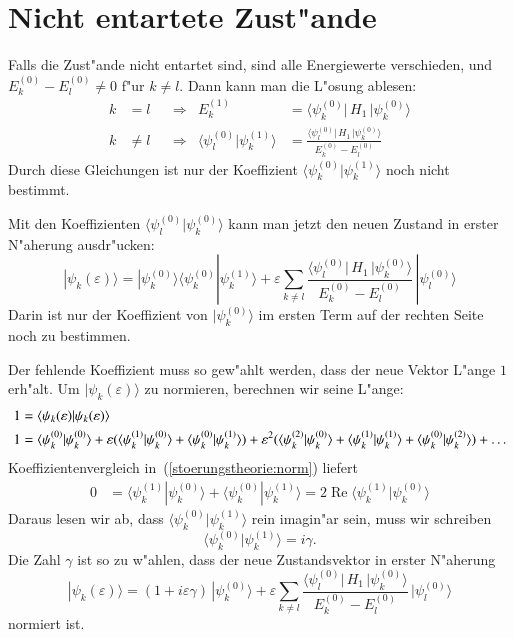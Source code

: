 \section{Nicht entartete Zust"ande\label{section:nichtentartetezustaende}}
Falls die Zust"ande nicht entartet sind, sind alle Energiewerte
verschieden, und $E_k^{(0)}-E_l^{(0)}\ne 0$ f"ur $k\ne l$. 
Dann kann man die L"osung ablesen:
\begin{equation}
\begin{aligned}
k&=l
&&\Rightarrow&
E_k^{(1)}
&=
\langle \psi_k^{(0)}|\, H_1 \,|\psi_k^{(0)}\rangle
\\
k&\ne l
&&\Rightarrow&
\langle\psi_l^{(0)}|\psi_k^{(1)}\rangle
&=
\frac{\langle \psi_l^{(0)}|\, H_1 \,|\psi_k^{(0)}\rangle}{E_k^{(0)}-E_l^{(0)}}
\end{aligned}
\label{stoerungsloesung1ordnung}
\end{equation}
Durch diese Gleichungen ist nur der Koeffizient
$\langle\psi_k^{(0)}|\psi_k^{(1)}\rangle$
noch nicht bestimmt.

Mit den Koeffizienten $\langle\psi_l^{(0)}|\psi_k^{(0)}\rangle$ kann
man jetzt den neuen Zustand in erster N"aherung ausdr"ucken:
\begin{equation}
|\psi_k(\varepsilon)\rangle
=
|\psi_k^{(0)}\rangle
\langle\psi_k^{(0)}|\psi_k^{(1)}\rangle
+\varepsilon
\sum_{k\ne l}
\frac{\langle \psi_l^{(0)}|\, H_1 \,|\psi_k^{(0)}\rangle}{E_k^{(0)}-E_l^{(0)}}
\,
|\psi_l^{(0)}\rangle
\end{equation}
Darin ist nur der Koeffizient von $|\psi_k^{(0)}\rangle$ im ersten
Term auf der rechten Seite noch zu bestimmen.

Der fehlende Koeffizient muss so gew"ahlt werden, dass der neue
Vektor L"ange $1$ erh"alt.
Um $|\psi_k(\varepsilon)\rangle$ zu normieren, berechnen wir seine L"ange:
\begin{align}
1
&=
\langle\psi_k(\varepsilon)|\psi_k(\varepsilon)\rangle
\notag
\\
1
&=
\langle \psi_k^{(0)}|\psi_k^{(0)}\rangle
+
\varepsilon(
\langle \psi_k^{(1)}|\psi_k^{(0)}\rangle
+
\langle \psi_k^{(0)}|\psi_k^{(1)}\rangle
)
+
\varepsilon^2(
\langle \psi_k^{(2)}|\psi_k^{(0)}\rangle
+
\langle \psi_k^{(1)}|\psi_k^{(1)}\rangle
+
\langle \psi_k^{(0)}|\psi_k^{(2)}\rangle
)
+\dots
\label{stoerungstheorie:norm}
\end{align}
Koeffizientenvergleich in~(\ref{stoerungstheorie:norm}) liefert
\begin{align*}
0
&=
\langle \psi_k^{(1)}|\psi_k^{(0)}\rangle
+
\langle \psi_k^{(0)}|\psi_k^{(1)}\rangle
=
2\operatorname{Re}\langle \psi_k^{(1)}|\psi_k^{(0)}\rangle
\end{align*}
Daraus lesen wir ab, dass $\langle\psi_k^{(0)}|\psi_k^{(1)}\rangle$
rein imagin"ar sein, muss wir schreiben
\[
\langle\psi_k^{(0)}|\psi_k^{(1)}\rangle = i\gamma.
\]
Die Zahl $\gamma$ ist so zu w"ahlen, dass der neue Zustandsvektor
in erster N"aherung
\begin{equation}
|\psi_k(\varepsilon)\rangle
=
(1+i\varepsilon \gamma)
\,|\psi_k^{(0)}\rangle
+
\varepsilon
\sum_{k\ne l}
\frac{\langle \psi_l^{(0)}|\, H_1 \,|\psi_k^{(0)}\rangle}{E_k^{(0)}-E_l^{(0)}}
\,
|\psi_l^{(0)}\rangle
\end{equation}
normiert ist.

